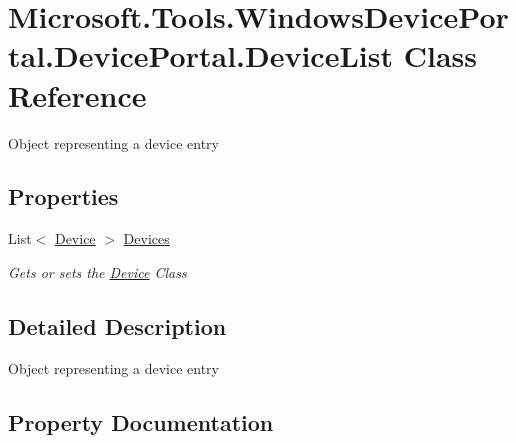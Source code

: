 \hypertarget{class_microsoft_1_1_tools_1_1_windows_device_portal_1_1_device_portal_1_1_device_list}{}\section{Microsoft.\+Tools.\+Windows\+Device\+Portal.\+Device\+Portal.\+Device\+List Class Reference}
\label{class_microsoft_1_1_tools_1_1_windows_device_portal_1_1_device_portal_1_1_device_list}


Object representing a device entry  


\subsection*{Properties}
\begin{DoxyCompactItemize}
\item 
List$<$ \hyperlink{class_microsoft_1_1_tools_1_1_windows_device_portal_1_1_device_portal_1_1_device}{Device} $>$ \hyperlink{class_microsoft_1_1_tools_1_1_windows_device_portal_1_1_device_portal_1_1_device_list_a08da5165aa55ca37e9324c10517d5045}{Devices}
\begin{DoxyCompactList}\small\item\em Gets or sets the \hyperlink{class_microsoft_1_1_tools_1_1_windows_device_portal_1_1_device_portal_1_1_device}{Device} Class \end{DoxyCompactList}\end{DoxyCompactItemize}


\subsection{Detailed Description}
Object representing a device entry 



\subsection{Property Documentation}
